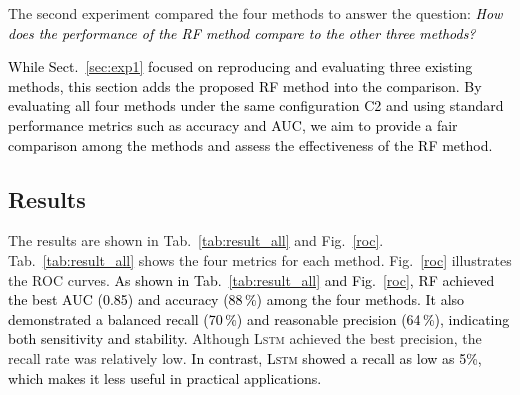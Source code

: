 \documentclass[letterpaper, 10 pt, conference]{ieeeconf}  %
\newcommand{\Review}[1]{\textcolor{black}{#1}}
\newcommand{\Ishii}[1]{\textcolor{black}{#1}}
\newcommand{\Impl}[1]{\textsc{#1}}
\begin{document}
The second experiment compared the four methods to answer the question:
\Ishii{\emph{How does the performance of the \Impl{RF} method compare to the other three methods?}}

\Review{While Sect.~\ref{sec:exp1} focused on reproducing and evaluating three existing methods, this section adds the proposed \Impl{RF} method into the comparison. By evaluating all four methods under the same configuration C2 and using standard performance metrics such as accuracy and AUC, we aim to provide a fair comparison among the methods and assess the effectiveness of the \Impl{RF} method.}

\subsection{Results}

The results are shown in Tab.~\ref{tab:result_all} and Fig.~\ref{roc}.
Tab.~\ref{tab:result_all} shows the four metrics for each method.
Fig.~\ref{roc} illustrates the ROC curves.
%
\Review{As shown in Tab.~\ref{tab:result_all} and Fig.~\ref{roc}, \Impl{RF} achieved the best AUC (0.85) and accuracy (88\,\%) among the four methods. It also demonstrated a balanced recall (70\,\%) and reasonable precision (64\,\%), indicating both sensitivity and stability.}
Although \Impl{Lstm} achieved the best precision, the recall rate was relatively low.
\Review{In contrast, \Impl{Lstm} showed a recall as low as 5\%, which makes it less useful in practical applications.}
\end{document}
